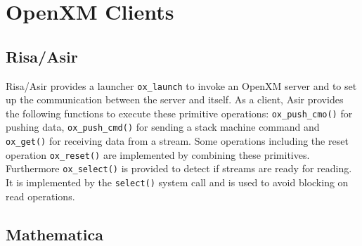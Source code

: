 
\section{OpenXM Clients}    

\subsection{Risa/Asir}

Risa/Asir provides a launcher {\tt ox\_launch}
to invoke an OpenXM server and to set up the
communication between the server and itself.
As a client, Asir provides the following functions
to execute these primitive operations:
{\tt ox\_push\_cmo()} for pushing data,
{\tt ox\_push\_cmd()} for sending a stack machine command
and {\tt ox\_get()} for receiving data from a stream.
Some operations including the reset operation {\tt ox\_reset()} 
are implemented by combining these primitives.
%
%
%
%
%
%
%
Furthermore {\tt ox\_select()} is provided to detect if streams are ready for
reading. It is implemented by the {\tt select()} system call and is used
to avoid blocking on read operations.

\subsection{Mathematica}

